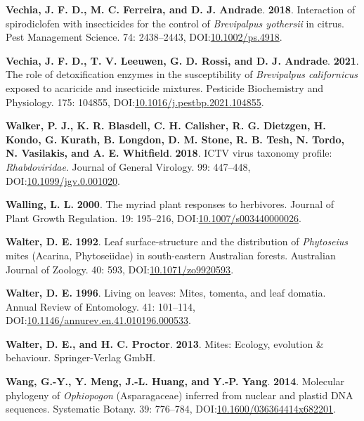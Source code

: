 \documentclass[12pt,final,CPage]{ufthesis}
\newlength{\cslhangindent}
\newenvironment{CSLReferences}[2] %
{%
	\setlength{\parindent}{0pt}
	\ifodd #1 \everypar{\setlength{\hangindent}{\cslhangindent}}\ignorespaces\fi
	\ifnum #2 > 0
	\setlength{\parskip}{#2\baselineskip}
	\fi
}%
{}
\begin{document}
{\begin{CSLReferences}{1}{0}
  \leavevmode{}%
  \textbf{Vechia, J. F. D., M. C. Ferreira, and D. J. Andrade}. \textbf{2018}. Interaction of spirodiclofen with insecticides for the control of {\emph{Brevipalpus yothersii}} in citrus. Pest Management Science. 74: 2438--2443, DOI:\href{https://doi.org/10.1002/ps.4918}{10.1002/ps.4918}.

  \leavevmode{}%
  \textbf{Vechia, J. F. D., T. V. Leeuwen, G. D. Rossi, and D. J. Andrade}. \textbf{2021}. The role of detoxification enzymes in the susceptibility of {\emph{Brevipalpus californicus}} exposed to acaricide and insecticide mixtures. Pesticide Biochemistry and Physiology. 175: 104855, DOI:\href{https://doi.org/10.1016/j.pestbp.2021.104855}{10.1016/j.pestbp.2021.104855}.

  \leavevmode{}%
  \textbf{Walker, P. J., K. R. Blasdell, C. H. Calisher, R. G. Dietzgen, H. Kondo, G. Kurath, B. Longdon, D. M. Stone, R. B. Tesh, N. Tordo, N. Vasilakis, and A. E. Whitfield}. \textbf{2018}. {ICTV} virus taxonomy profile: {\emph{Rhabdoviridae}}. Journal of General Virology. 99: 447--448, DOI:\href{https://doi.org/10.1099/jgv.0.001020}{10.1099/jgv.0.001020}.

  \leavevmode{}%
  \textbf{Walling, L. L.} \textbf{2000}. The myriad plant responses to herbivores. Journal of Plant Growth Regulation. 19: 195--216, DOI:\href{https://doi.org/10.1007/s003440000026}{10.1007/s003440000026}.

  \leavevmode{}%
  \textbf{Walter, D. E.} \textbf{1992}. Leaf surface-structure and the distribution of {\emph{Phytoseius}} mites ({Acarina}, {Phytoseiidae}) in south-eastern {Australian} forests. Australian Journal of Zoology. 40: 593, DOI:\href{https://doi.org/10.1071/zo9920593}{10.1071/zo9920593}.

  \leavevmode{}%
  \textbf{Walter, D. E.} \textbf{1996}. Living on leaves: Mites, tomenta, and leaf domatia. Annual Review of Entomology. 41: 101--114, DOI:\href{https://doi.org/10.1146/annurev.en.41.010196.000533}{10.1146/annurev.en.41.010196.000533}.

  \leavevmode{}%
  \textbf{Walter, D. E., and H. C. Proctor}. \textbf{2013}. Mites: Ecology, evolution \& behaviour. Springer-Verlag GmbH.

  \leavevmode{}%
  \textbf{Wang, G.-Y., Y. Meng, J.-L. Huang, and Y.-P. Yang}. \textbf{2014}. Molecular phylogeny of {\emph{Ophiopogon}} {({Asparagaceae})} inferred from nuclear and plastid {DNA} sequences. Systematic Botany. 39: 776--784, DOI:\href{https://doi.org/10.1600/036364414x682201}{10.1600/036364414x682201}.


\end{CSLReferences}}
\end{document}
